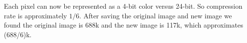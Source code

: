 \begin{answer}
    Each pixel can now be represented as a 4-bit color versus 24-bit. So compression rate is approximately $1/6$. After saving the original image and new image we found the original image is 688k and the new image is 117k, which approximates (688/6)k.
\end{answer}
